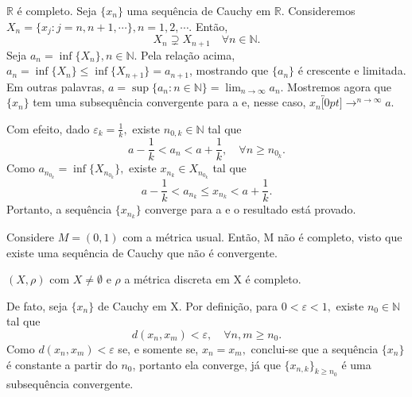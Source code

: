 \documentclass[metric_notes.tex]{subfiles}
\begin{document}
\begin{example}
	\(\mathbb{R}\) é completo. Seja \(\{x_{n}\}\) uma sequência de Cauchy em \(\mathbb{R}\). Consideremos \(X_{n}= \{x_{j}:j = n, n + 1, \cdots\}, n = 1, 2, \cdots\).
	Então,
	\[
		X_{n} \supsetneq{X_{n+1}}\quad \forall n\in \mathbb{N}.
	\]
	Seja \(a_{n} = \inf\{X_{n}\}, n\in \mathbb{N}.\) Pela relação acima, \(a_{n} = \inf\{X_{n}\}\leq \inf\{X_{n+1}\} = a_{n+1}\), mostrando que \(\{a_{n}\}\) é crescente e
	limitada. Em outras palavras, \(a = \sup\{a_{n}: n\in \mathbb{N}\} = \lim_{n\to \infty}a_{n}.\)
	Mostremos agora que \(\{x_{n}\}\) tem uma subsequência convergente para a e, nesse caso, \(x_{n}\overbracket[0pt]{\longrightarrow}^{n\to \infty}a.\)

	Com efeito, dado \(\varepsilon_{k} = \frac{1}{k},\) existe \(n_{0, k}\in \mathbb{N}\) tal que
	\[
		a-\frac{1}{k} < a_{n} < a + \frac{1}{k},\quad \forall n\geq n_{0_{k}}.
	\]
	Como \(a_{n_{0_{k}}}=\inf\{X_{n_{0_{k}}}\},\) existe \(x_{n_{k}}\in X_{n_{0_{k}}}\) tal que
	\[
		a - \frac{1}{k} < a_{n_{k}}\leq x_{n_{k}} < a + \frac{1}{k}.
	\]
	Portanto, a sequência \(\{x_{n_{k}}\}\) converge para a e o resultado está provado.
\end{example}
\begin{example}
	Considere \(M = (0, 1)\) com a métrica usual. Então, M não é completo, visto que existe uma sequência de Cauchy que não é convergente.
\end{example}
\begin{example}
	\((X, \rho )\) com \(X \neq\emptyset\) e \(\rho \) a métrica discreta em X é completo.

	De fato, seja \(\{x_{n}\}\) de Cauchy em X. Por definição, para \(0 < \varepsilon < 1,\) existe \(n_{0}\in \mathbb{N}\) tal que
	\[
		d(x_{n}, x_{m}) < \varepsilon, \quad \forall n,m\geq n_{0}.
	\]
	Como \(d(x_{n}, x_{m}) < \varepsilon \) se, e somente se, \(x_{n} = x_{m},\) conclui-se que a sequência \(\{x_{n}\}\) é constante a partir do \(n_{0}\),
	portanto ela converge, já que \(\{x_{n, k}\}_{k\geq n_{0}}\) é uma subsequência convergente.
\end{example}
\end{document}
